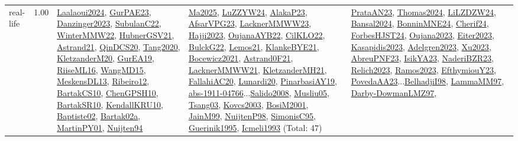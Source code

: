 {\begin{longtable}{p{3cm}r>{\raggedright\arraybackslash}p{6cm}>{\raggedright\arraybackslash}p{6cm}>{\raggedright\arraybackslash}p{8cm}}
\index{real-life}\index{Benchmarks!real-life}real-life &  1.00 & \hyperref[detail:Laalaoui2024]{Laalaoui2024}, \hyperref[detail:GurPAE23]{GurPAE23}, \hyperref[detail:Danzinger2023]{Danzinger2023}, \hyperref[detail:SubulanC22]{SubulanC22}, \hyperref[detail:WinterMMW22]{WinterMMW22}, \hyperref[detail:HubnerGSV21]{HubnerGSV21}, \hyperref[detail:Astrand21]{Astrand21}, \hyperref[detail:QinDCS20]{QinDCS20}, \hyperref[detail:Tang2020]{Tang2020}, \hyperref[detail:KletzanderM20]{KletzanderM20}, \hyperref[detail:GurEA19]{GurEA19}, \hyperref[detail:RiiseML16]{RiiseML16}, \hyperref[detail:WangMD15]{WangMD15}, \hyperref[detail:MeskensDL13]{MeskensDL13}, \hyperref[detail:Ribeiro12]{Ribeiro12}, \hyperref[detail:BartakCS10]{BartakCS10}, \hyperref[detail:ChenGPSH10]{ChenGPSH10}, \hyperref[detail:BartakSR10]{BartakSR10}, \hyperref[detail:KendallKRU10]{KendallKRU10}, \hyperref[detail:Baptiste02]{Baptiste02}, \hyperref[detail:Bartak02a]{Bartak02a}, \hyperref[detail:MartinPY01]{MartinPY01}, \hyperref[detail:Nuijten94]{Nuijten94} & \hyperref[detail:Ma2025]{Ma2025}, \hyperref[detail:LuZZYW24]{LuZZYW24}, \hyperref[detail:AlakaP23]{AlakaP23}, \hyperref[detail:AfsarVPG23]{AfsarVPG23}, \hyperref[detail:LacknerMMWW23]{LacknerMMWW23}, \hyperref[detail:Hajji2023]{Hajji2023}, \hyperref[detail:OujanaAYB22]{OujanaAYB22}, \hyperref[detail:CilKLO22]{CilKLO22}, \hyperref[detail:BulckG22]{BulckG22}, \hyperref[detail:Lemos21]{Lemos21}, \hyperref[detail:KlankeBYE21]{KlankeBYE21}, \hyperref[detail:Bocewicz2021]{Bocewicz2021}, \hyperref[detail:Astrand0F21]{Astrand0F21}, \hyperref[detail:LacknerMMWW21]{LacknerMMWW21}, \hyperref[detail:KletzanderMH21]{KletzanderMH21}, \hyperref[detail:FallahiAC20]{FallahiAC20}, \hyperref[detail:Lunardi20]{Lunardi20}, \hyperref[detail:PinarbasiAY19]{PinarbasiAY19}, \hyperref[detail:abs-1911-04766]{abs-1911-04766}...\hyperref[detail:Salido2008]{Salido2008}, \hyperref[detail:Musliu05]{Musliu05}, \hyperref[detail:Tsang03]{Tsang03}, \hyperref[detail:Kovcs2003]{Kovcs2003}, \hyperref[detail:BosiM2001]{BosiM2001}, \hyperref[detail:JainM99]{JainM99}, \hyperref[detail:NuijtenP98]{NuijtenP98}, \hyperref[detail:SimonisC95]{SimonisC95}, \hyperref[detail:Guerinik1995]{Guerinik1995}, \hyperref[detail:Icmeli1993]{Icmeli1993} (Total: 47) & \hyperref[detail:PrataAN23]{PrataAN23}, \hyperref[detail:Thomas2024]{Thomas2024}, \hyperref[detail:LiLZDZW24]{LiLZDZW24}, \hyperref[detail:Bansal2024]{Bansal2024}, \hyperref[detail:BonninMNE24]{BonninMNE24}, \hyperref[detail:Cherif24]{Cherif24}, \hyperref[detail:ForbesHJST24]{ForbesHJST24}, \hyperref[detail:Oujana2023]{Oujana2023}, \hyperref[detail:Eiter2023]{Eiter2023}, \hyperref[detail:Kasapidis2023]{Kasapidis2023}, \hyperref[detail:Adelgren2023]{Adelgren2023}, \hyperref[detail:Xu2023]{Xu2023}, \hyperref[detail:AbreuPNF23]{AbreuPNF23}, \hyperref[detail:IsikYA23]{IsikYA23}, \hyperref[detail:NaderiBZR23]{NaderiBZR23}, \hyperref[detail:Relich2023]{Relich2023}, \hyperref[detail:Ramos2023]{Ramos2023}, \hyperref[detail:EfthymiouY23]{EfthymiouY23}, \hyperref[detail:PovedaAA23]{PovedaAA23}...\hyperref[detail:BelhadjiI98]{BelhadjiI98}, \hyperref[detail:LammaMM97]{LammaMM97}, \hyperref[detail:Darby-DowmanLMZ97]{Darby-DowmanLMZ97}, 
\end{longtable}}
